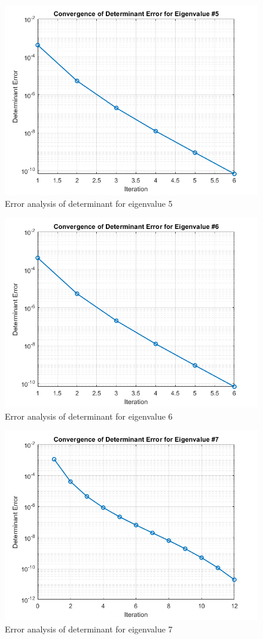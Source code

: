 \begin{example}
\vspace{40pt}
\begin{figure}[h]
    \centering
    \includegraphics[width=.79\linewidth]{Figures/eigen_5.png}
    \caption{Error analysis of determinant for eigenvalue 5}
    \label{fig-eigenvalue5}
\end{figure}

\begin{figure}[h]
    \centering
    \includegraphics[width=.79\linewidth]{Figures/eigen_6.png}
    \caption{Error analysis of determinant for eigenvalue 6}
    \label{fig-eigenvalue6}
\end{figure}

\begin{figure}[h]
    \centering
    \includegraphics[width=.79\linewidth]{Figures/eigen_7..png}
    \caption{Error analysis of determinant for eigenvalue 7}
    \label{fig-eigenvalue7}
\end{figure}



\end{example}

